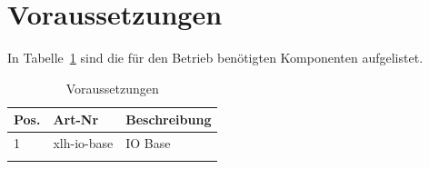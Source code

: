 \documentclass[10pt]{datasheet}
\begin{document}

%

\section{Voraussetzungen}
In Tabelle~\ref{tab:voraussetzungen} sind die für den Betrieb benötigten Komponenten aufgelistet.

\begin{table}[h]
\begin{threeparttable}
\caption{Voraussetzungen \xlhPlattformID}
    \begin{tabularx}{\textwidth}{l | l | l }
        \thickhline
        \textbf{Pos.} & \textbf{Art-Nr} & \textbf{Beschreibung} \\
        \hline
        1 & xlh-io-base & IO Base \\
        \thickhline
    \end{tabularx}

\label{tab:voraussetzungen}
\end{threeparttable}
\end{table}
\end{document}
